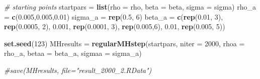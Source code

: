 \documentclass[]{article}
\newenvironment{Shaded}{\begin{snugshade}}{\end{snugshade}}
\newcommand{\CommentTok}[1]{\textcolor[rgb]{0.56,0.35,0.01}{\textit{#1}}}
\newcommand{\DataTypeTok}[1]{\textcolor[rgb]{0.13,0.29,0.53}{#1}}
\newcommand{\DecValTok}[1]{\textcolor[rgb]{0.00,0.00,0.81}{#1}}
\newcommand{\FloatTok}[1]{\textcolor[rgb]{0.00,0.00,0.81}{#1}}
\newcommand{\KeywordTok}[1]{\textcolor[rgb]{0.13,0.29,0.53}{\textbf{#1}}}
\newcommand{\NormalTok}[1]{#1}
\newcommand{\StringTok}[1]{\textcolor[rgb]{0.31,0.60,0.02}{#1}}
\begin{document}
\begin{Shaded}
\begin{Highlighting}[]
\CommentTok{# starting points}
\NormalTok{startpars =}\StringTok{ }\KeywordTok{list}\NormalTok{(}\DataTypeTok{rho =}\NormalTok{ rho, }\DataTypeTok{beta =}\NormalTok{ beta, }\DataTypeTok{sigma =}\NormalTok{ sigma)}
\NormalTok{rho_a =}\StringTok{ }\KeywordTok{c}\NormalTok{(}\FloatTok{0.005}\NormalTok{,}\FloatTok{0.005}\NormalTok{,}\FloatTok{0.01}\NormalTok{)}
\NormalTok{sigma_a =}\StringTok{ }\KeywordTok{rep}\NormalTok{(}\FloatTok{0.5}\NormalTok{, }\DecValTok{6}\NormalTok{)}
\NormalTok{beta_a =}\StringTok{ }\KeywordTok{c}\NormalTok{(}\KeywordTok{rep}\NormalTok{(}\FloatTok{0.01}\NormalTok{, }\DecValTok{3}\NormalTok{), }\KeywordTok{rep}\NormalTok{(}\FloatTok{0.0005}\NormalTok{, }\DecValTok{2}\NormalTok{), }\FloatTok{0.001}\NormalTok{, }\KeywordTok{rep}\NormalTok{(}\FloatTok{0.0001}\NormalTok{, }\DecValTok{3}\NormalTok{), }\KeywordTok{rep}\NormalTok{(}\FloatTok{0.005}\NormalTok{,}\DecValTok{6}\NormalTok{), }\FloatTok{0.01}\NormalTok{, }\KeywordTok{rep}\NormalTok{(}\FloatTok{0.005}\NormalTok{, }\DecValTok{5}\NormalTok{))}
\end{Highlighting}
\end{Shaded}

\begin{Shaded}
\begin{Highlighting}[]
\KeywordTok{set.seed}\NormalTok{(}\DecValTok{123}\NormalTok{)}
\NormalTok{MHresults =}\StringTok{ }\KeywordTok{regularMHstep}\NormalTok{(startpars, }\DataTypeTok{niter =} \DecValTok{2000}\NormalTok{, }\DataTypeTok{rhoa =}\NormalTok{ rho_a, }\DataTypeTok{betaa =}\NormalTok{ beta_a, }\DataTypeTok{sigmaa =}\NormalTok{ sigma_a)}

\CommentTok{#save(MHresults, file="result_2000_2.RData")}
\end{Highlighting}
\end{Shaded}
\end{document}
